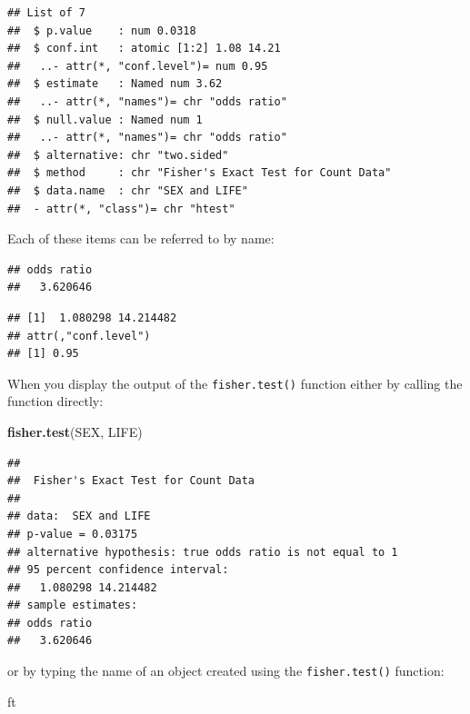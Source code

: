 \documentclass[12pt,a4paper]{book}
\newenvironment{Shaded}{\begin{snugshade}}{\end{snugshade}}
\newcommand{\KeywordTok}[1]{\textcolor[rgb]{0.13,0.29,0.53}{\textbf{#1}}}
\newcommand{\NormalTok}[1]{#1}
\newcommand{\OperatorTok}[1]{\textcolor[rgb]{0.81,0.36,0.00}{\textbf{#1}}}
\theoremstyle{definition}
\theoremstyle{definition}
\theoremstyle{definition}
\theoremstyle{remark}
\begin{document}
\begin{verbatim}
## List of 7
##  $ p.value    : num 0.0318
##  $ conf.int   : atomic [1:2] 1.08 14.21
##   ..- attr(*, "conf.level")= num 0.95
##  $ estimate   : Named num 3.62
##   ..- attr(*, "names")= chr "odds ratio"
##  $ null.value : Named num 1
##   ..- attr(*, "names")= chr "odds ratio"
##  $ alternative: chr "two.sided"
##  $ method     : chr "Fisher's Exact Test for Count Data"
##  $ data.name  : chr "SEX and LIFE"
##  - attr(*, "class")= chr "htest"
\end{verbatim}

Each of these items can be referred to by name:

\begin{Shaded}
\end{Shaded}

\begin{verbatim}
## odds ratio 
##   3.620646
\end{verbatim}

\begin{verbatim}
## [1]  1.080298 14.214482
## attr(,"conf.level")
## [1] 0.95
\end{verbatim}

When you display the output of the \texttt{fisher.test()} function
either by calling the function directly:

\begin{Shaded}
\begin{Highlighting}[]
\KeywordTok{fisher.test}\NormalTok{(SEX, LIFE)}
\end{Highlighting}
\end{Shaded}

\begin{verbatim}
## 
##  Fisher's Exact Test for Count Data
## 
## data:  SEX and LIFE
## p-value = 0.03175
## alternative hypothesis: true odds ratio is not equal to 1
## 95 percent confidence interval:
##   1.080298 14.214482
## sample estimates:
## odds ratio 
##   3.620646
\end{verbatim}

or by typing the name of an object created using the
\texttt{fisher.test()} function:

\begin{Shaded}
\begin{Highlighting}[]
\NormalTok{ft}
\end{Highlighting}
\end{Shaded}
\end{document}
